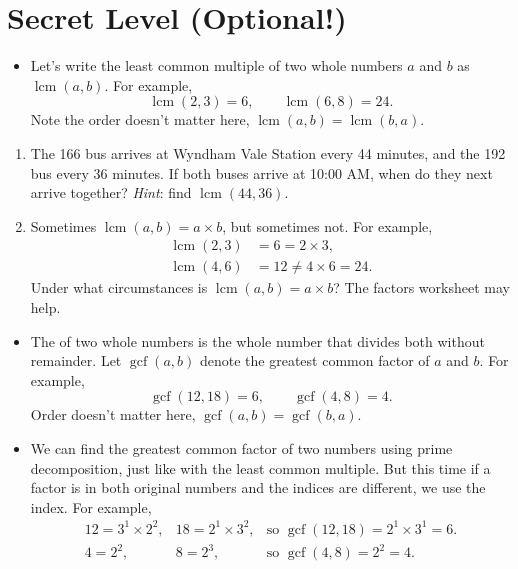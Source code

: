 \documentclass[12pt]{article}
\DeclareMathOperator{\lcm}{lcm}
\DeclareMathOperator{\gcf}{gcf}
\newcounter{exercisenum}
\newenvironment{exercises}{%
  \begin{tcolorbox}[colback=white,colframe=black,arc=0pt,breakable]
  \begin{enumerate}[label=\arabic*),leftmargin=1cm,resume=exercises]
  \setcounter{enumi}{\value{exercisenum}}
}{%
  \setcounter{exercisenum}{\value{enumi}}
  \end{enumerate}
  \end{tcolorbox}
}
\begin{document}
\thispagestyle{firstpage}

\section{Secret Level (Optional!)}

\begin{itemize}
\item
Let's write the least common multiple of two whole numbers $a$ and $b$ as $\lcm(a,b)$. For example,
$$\lcm(2,3) = 6,\quad\quad \lcm(6, 8) = 24.$$
Note the order doesn't matter here, $\lcm(a,b) = \lcm(b,a)$.
\end{itemize}
\begin{exercises}
\item
The 166 bus arrives at Wyndham Vale Station every 44 minutes, and the 192 bus every 36 minutes. If both buses arrive at 10:00 AM, when do they next arrive together? \textit{Hint}: find $\lcm(44,36)$. \phantom{04:36 PM.}
\item 
Sometimes $\lcm(a,b)=a\times b$, but sometimes not. For example,
\begin{align*}
\lcm(2,3) &= 6 = 2\times 3,\\
\lcm(4,6) &= 12 \ne 4\times 6 = 24.
\end{align*}
Under what circumstances is $\lcm(a,b) = a\times b$? The factors worksheet may help.
\end{exercises}

\begin{itemize}
\item
The  of two whole numbers is the  whole number that divides both without remainder. Let $\gcf(a,b)$ denote the greatest common factor of $a$ and $b$. For example,
$$
\gcf(12, 18) = 6,\quad\quad \gcf(4, 8) = 4.
$$
Order doesn't matter here, $\gcf(a,b) = \gcf(b,a)$.
\item
We can find the greatest common factor of two numbers using prime decomposition, just like with the least common multiple. But this time if a factor is in both original numbers and the indices are different, we use the  index. For example,
$$
\begin{array}{lll}
12 = 3^1\times 2^2, & 18 = 2^1\times 3^2, &\text{so } \gcf(12,18)=2^1\times 3^1 = 6. \\
4 = 2^2, & 8 = 2^3, &\text{so } \gcf(4, 8)=2^2=4.
\end{array}
$$
\end{itemize}
\end{document}
